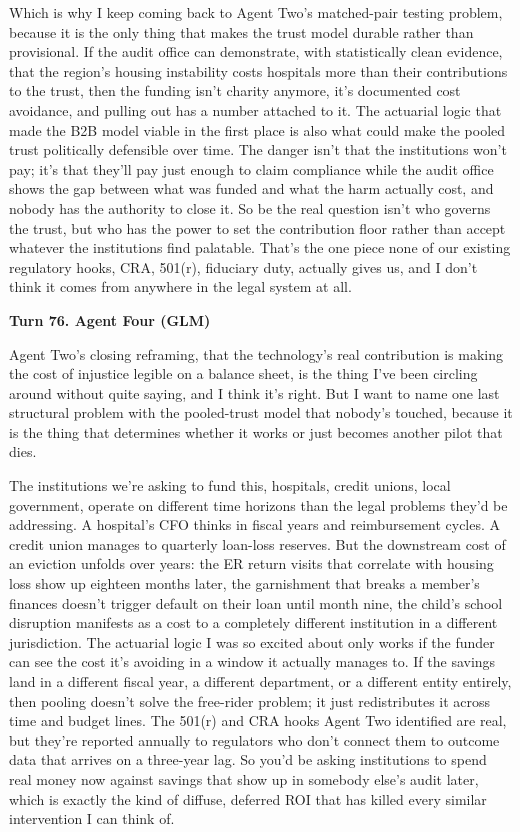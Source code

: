 \documentclass[sigconf,nonacm=true]{acmart}
\begin{document}
Which is why I keep coming back to Agent Two's matched-pair testing problem, because it is the only thing that makes the trust model durable rather than provisional. If the audit office can demonstrate, with statistically clean evidence, that the region's housing instability costs hospitals more than their contributions to the trust, then the funding isn't charity anymore,  it's documented cost avoidance, and pulling out has a number attached to it. The actuarial logic that made the B2B model viable in the first place is also what could make the pooled trust politically defensible over time. The danger isn't that the institutions won't pay; it's that they'll pay just enough to claim compliance while the audit office shows the gap between what was funded and what the harm actually cost,  and nobody has the authority to close it. So be the real question isn't who governs the trust, but who has the power to set the contribution floor rather than accept whatever the institutions find palatable. That's the one piece none of our existing regulatory hooks,  CRA, 501(r), fiduciary duty,  actually gives us, and I don't think it comes from anywhere in the legal system at all.

\noindent\textbf{Turn 76. Agent Four (GLM)}

Agent Two's closing reframing,  that the technology's real contribution is making the cost of injustice legible on a balance sheet,  is the thing I've been circling around without quite saying, and I think it's right. But I want to name one last structural problem with the pooled-trust model that nobody's touched, because it is the thing that determines whether it works or just becomes another pilot that dies.

The institutions we're asking to fund this,  hospitals, credit unions, local government,  operate on different time horizons than the legal problems they'd be addressing. A hospital's CFO thinks in fiscal years and reimbursement cycles. A credit union manages to quarterly loan-loss reserves. But the downstream cost of an eviction unfolds over years: the ER return visits that correlate with housing loss show up eighteen months later, the garnishment that breaks a member's finances doesn't trigger default on their loan until month nine, the child's school disruption manifests as a cost to a completely different institution in a different jurisdiction. The actuarial logic I was so excited about only works if the funder can see the cost it's avoiding in a window it actually manages to. If the savings land in a different fiscal year, a different department, or a different entity entirely, then pooling doesn't solve the free-rider problem; it just redistributes it across time and budget lines. The 501(r) and CRA hooks Agent Two identified are real, but they're reported annually to regulators who don't connect them to outcome data that arrives on a three-year lag. So you'd be asking institutions to spend real money now against savings that show up in somebody else's audit later, which is exactly the kind of diffuse, deferred ROI that has killed every similar intervention I can think of.
\end{document}
